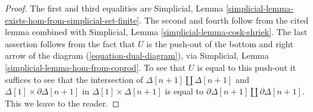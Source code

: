 \documentclass[10pt,a4paper]{amsart}
\theoremstyle{plain}
\theoremstyle{definition}
\theoremstyle{remark}
\numberwithin{equation}{subsection}
\begin{document}
\begin{proof}
The first and third equalities are
Simplicial, Lemma \ref{simplicial-lemma-exists-hom-from-simplicial-set-finite}.
The second and fourth follow from the cited lemma combined with
Simplicial, Lemma \ref{simplicial-lemma-cosk-shriek}.
The last assertion follows from the fact that
$U$ is the push-out of the bottom and right arrow of the
diagram (\ref{equation-dual-diagram}), via
Simplicial, Lemma \ref{simplicial-lemma-hom-from-coprod}.
To see that $U$ is equal to this push-out it suffices
to see that the intersection of
$\Delta[n + 1] \amalg \Delta[n + 1]$ and
$\Delta[1] \times \partial\Delta[n + 1]$
in $\Delta[1] \times \Delta[n + 1]$ is equal to
$\partial\Delta[n + 1] \amalg \partial\Delta[n + 1]$.
This we leave to the reader.
\end{proof}
\end{document}
